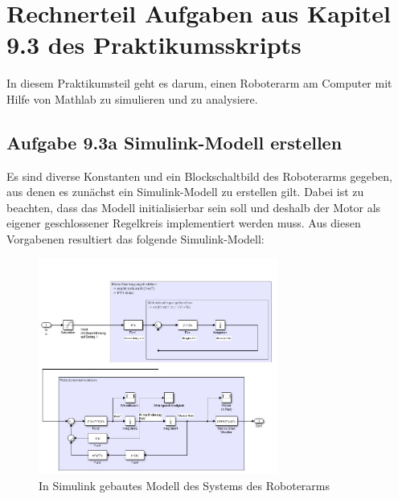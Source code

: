 \documentclass[10pt]{scrartcl}
\begin{document}








\section{Rechnerteil Aufgaben aus Kapitel 9.3 des Praktikumsskripts}
In diesem Praktikumsteil geht es darum, einen Roboterarm am Computer mit Hilfe von Mathlab zu simulieren und zu analysiere. 
\subsection{Aufgabe 9.3a Simulink-Modell erstellen}
Es sind diverse Konstanten und ein Blockschaltbild des Roboterarms gegeben, aus denen es zunächst ein Simulink-Modell zu erstellen gilt. Dabei ist zu beachten, dass das Modell initialisierbar sein soll und deshalb der Motor als eigener geschlossener Regelkreis implementiert werden muss. Aus diesen Vorgabenen resultiert das folgende Simulink-Modell:
\begin{figure}[H]
	\centering
	\includegraphics[width=0.7\textwidth]{Theoretischer Teil/SimulinkModell.jpeg}
	\caption{In Simulink gebautes Modell des Systems des Roboterarms}
	\label{img:grafik-dummy}
\end{figure}
\end{document}
